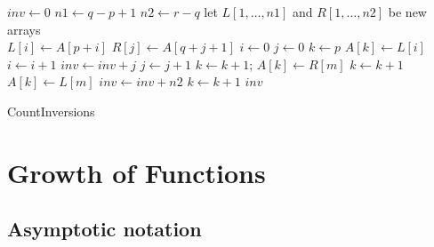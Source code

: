 \documentclass[fontsize=12pt,paper=a4,open=any]{book}
\begin{document}
\begin{enumerate}
\begin{enumerate}
\begin{algorithm}[H]
		$inv \longleftarrow 0$\;
		$n1 \longleftarrow q-p+1$\;
		$n2 \longleftarrow r-q$\;
		let $L[1,\dots , n1]$ and $R[1,\dots , n2]$ be new arrays\\
		{
			$L[i] \longleftarrow A[p+i]$\;
		}
		{
			$R[j] \longleftarrow A[q+j+1]$\;
		}
		$i \longleftarrow 0$\;
		$j \longleftarrow 0$\;		
		$k \longleftarrow p$\;
		{
			{
				$A[k] \longleftarrow L[i]$\;
				$i \longleftarrow i+1$\;
			}
			\Else
			{
				$inv \longleftarrow inv+j$ \;
				$j \longleftarrow j+1$\;
			}
			$k \longleftarrow k+1$;
		}
		{
			{
				$A[k] \longleftarrow R[m]$\;
				$k \longleftarrow k+1$\;
			}
		}
		{
			{
				$A[k] \longleftarrow L[m]$\;
				$inv \longleftarrow inv+n2$\; 
				$k \longleftarrow k+1$\;
			}
		}
		\Return $inv$\;
		\caption{CountInversions}
		\end{algorithm}
		
	\end{enumerate}
\end{enumerate}

\chapter{Growth of Functions}

\section{Asymptotic notation}
\end{document}
